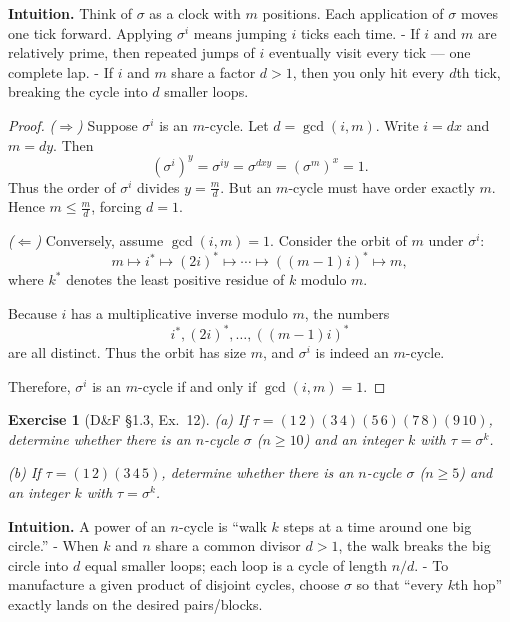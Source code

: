 \documentclass[12pt]{article}
\newtheorem{exercise}[theorem]{Exercise}
\theoremstyle{definition}
\begin{document}
\dotfill

\noindent\textbf{Intuition.}
Think of $\sigma$ as a clock with $m$ positions. Each application of $\sigma$ moves one tick forward.  
Applying $\sigma^{i}$ means jumping $i$ ticks each time.  
- If $i$ and $m$ are relatively prime, then repeated jumps of $i$ eventually visit every tick — one complete lap.  
- If $i$ and $m$ share a factor $d>1$, then you only hit every $d$th tick, breaking the cycle into $d$ smaller loops.  

\dotfill

\begin{proof}
\emph{($\Rightarrow$)} Suppose $\sigma^{i}$ is an $m$-cycle. Let $d=\gcd(i,m)$.  
Write $i=dx$ and $m=dy$. Then
\[
(\sigma^{i})^{y} = \sigma^{iy} = \sigma^{dxy} = (\sigma^{m})^{x} = 1.
\]
Thus the order of $\sigma^{i}$ divides $y=\tfrac{m}{d}$. But an $m$-cycle must have order exactly $m$.  
Hence $m \le \tfrac{m}{d}$, forcing $d=1$.  

\smallskip

\emph{($\Leftarrow$)} Conversely, assume $\gcd(i,m)=1$.  
Consider the orbit of $m$ under $\sigma^{i}$:
\[
m \mapsto i^{*} \mapsto (2i)^{*} \mapsto \cdots \mapsto ((m-1)i)^{*} \mapsto m,
\]
where $k^{*}$ denotes the least positive residue of $k$ modulo $m$.  

Because $i$ has a multiplicative inverse modulo $m$, the numbers
\[
i^{*}, (2i)^{*}, \dots, ((m-1)i)^{*}
\]
are all distinct. Thus the orbit has size $m$, and $\sigma^{i}$ is indeed an $m$-cycle.  

\smallskip

Therefore, $\sigma^{i}$ is an $m$-cycle if and only if $\gcd(i,m)=1$.
\end{proof}

\newpage

\begin{exercise}[D\&F §1.3, Ex.~12]
(a) If $\tau=(1\,2)(3\,4)(5\,6)(7\,8)(9\,10)$, determine whether there is an $n$-cycle $\sigma$ ($n\ge 10$)
and an integer $k$ with $\tau=\sigma^{k}$.

(b) If $\tau=(1\,2)(3\,4\,5)$, determine whether there is an $n$-cycle $\sigma$ ($n\ge 5$)
and an integer $k$ with $\tau=\sigma^{k}$.
\end{exercise}

\dotfill

\noindent\textbf{Intuition.}
A power of an $n$-cycle is “walk $k$ steps at a time around one big circle.”  
- When $k$ and $n$ share a common divisor $d>1$, the walk breaks the big circle into $d$ equal smaller loops; each loop is a cycle of length $n/d$.  
- To manufacture a given product of disjoint cycles, choose $\sigma$ so that “every $k$th hop” exactly lands on the desired pairs/blocks.
\end{document}
